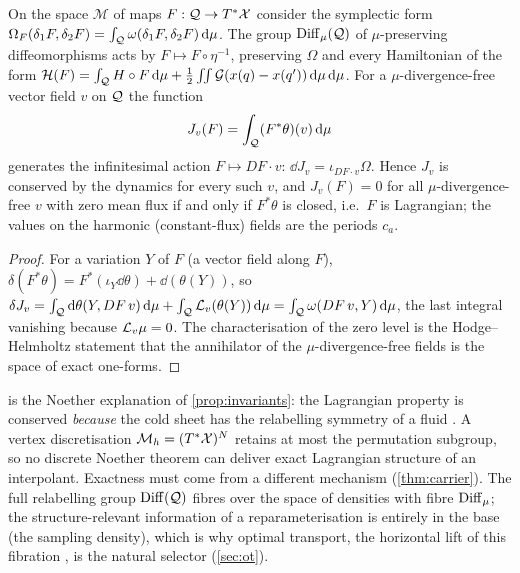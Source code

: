 \begin{theorem}\label{thm:momentum}
On the space $\mathcal M$ of maps $F:\mathcal{Q}\to T^*\mathcal{X}$ consider the symplectic form
$\Omega_F(\delta_1F,\delta_2F)=\int_{\mathcal{Q}}\omega(\delta_1F,\delta_2F)\,\mathrm{d}\mu$. The group $\operatorname{Diff}_\mu(\mathcal{Q})$ of
$\mu$-preserving diffeomorphisms acts by $F\mapsto F\circ\eta^{-1}$, preserving $\Omega$ and every Hamiltonian of
the form $\mathcal H(F)=\int_{\mathcal{Q}} H\circ F\,\mathrm{d}\mu+\tfrac12\iint\mathcal G(x(q)-x(q'))\,\mathrm{d}\mu\,\mathrm{d}\mu$. For a
$\mu$-divergence-free vector field $v$ on $\mathcal{Q}$ the function
\begin{equation}\label{eq:momentum}
J_v(F)=\int_{\mathcal{Q}} (F^*\theta)(v)\,\mathrm{d}\mu
\end{equation}
generates the infinitesimal action $F\mapsto DF\cdot v$: $\dd J_v=\iota_{DF\cdot v}\Omega$. Hence $J_v$ is conserved by
the dynamics for every such $v$, and $J_v(F)=0$ for all $\mu$-divergence-free $v$ with zero mean flux if and only
if $F^*\theta$ is closed, i.e.\ $F$ is Lagrangian; the values on the harmonic (constant-flux) fields are the periods
$c_a$.
\end{theorem}
\begin{proof}
For a variation $Y$ of $F$ (a vector field along $F$), $\delta(F^*\theta)=F^*(\iota_Y\dd\theta)+\dd(\theta(Y))$, so
$\delta J_v=\int_{\mathcal{Q}}\mathrm{d}\theta(Y,DF\,v)\,\mathrm{d}\mu+\int_{\mathcal{Q}}\mathcal{L}_v(\theta(Y))\,\mathrm{d}\mu
=\int_{\mathcal{Q}}\omega(DF\,v,Y)\,\mathrm{d}\mu$, the last integral vanishing because $\mathcal{L}_v\mu=0$. The characterisation of the zero
level is the Hodge--Helmholtz statement that the annihilator of the $\mu$-divergence-free fields is the space of exact one-forms.
\end{proof}

\begin{remark}\label{rem:noether}
 is the Noether explanation of \cref{prop:invariants}: the Lagrangian property is conserved
\emph{because} the cold sheet has the relabelling symmetry of a fluid \cite{Salmon1988}. A vertex discretisation
$\mathcal M_h=(T^*\mathcal{X})^N$ retains at most the permutation subgroup, so no discrete Noether theorem can deliver exact
Lagrangian structure of an interpolant. Exactness must come from a different mechanism (\cref{thm:carrier}).
The full relabelling group $\operatorname{Diff}(\mathcal{Q})$ fibres over the space of densities with fibre $\operatorname{Diff}_\mu$; the
structure-relevant information of a reparameterisation is entirely in the base (the sampling density), which is
why optimal transport, the horizontal lift of this fibration \cite{Otto2001}, is the natural selector (\cref{sec:ot}).
\end{remark}

